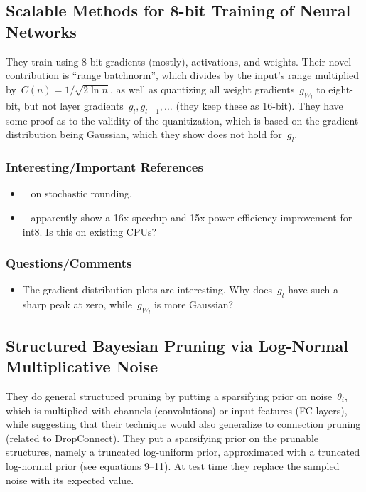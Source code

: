 \documentclass[a4paper, 12pt]{article}
\begin{document}
\subsection{Scalable Methods for 8-bit Training of Neural
            Networks~\cite{banner2018scalable}}

They train using 8-bit gradients (mostly), activations, and weights. Their
novel contribution is ``range batchnorm'', which divides by the input's range
multiplied by~$C(n) = 1/\sqrt{2\ln n}$, as well as quantizing all weight
gradients~$g_{W_l}$ to eight-bit, but not layer gradients~$g_l, g_{l - 1},
\dots$ (they keep these as 16-bit). They have some proof as to the validity of
the quanitization, which is based on the gradient distribution being Gaussian,
which they show does not hold for~$g_l$.

\subsubsection{Interesting/Important References}

\begin{itemize}
        \item~\cite{gupta2015deep} on stochastic rounding.

        \item~\cite{hubara2017jmlr} apparently show a 16x speedup and 15x power
                efficiency improvement for int8. Is this on existing CPUs?
\end{itemize}

\subsubsection{Questions/Comments}

\begin{itemize}
        \item The gradient distribution plots are interesting. Why does~$g_l$
                have such a sharp peak at zero, while~$g_{W_l}$ is more
                Gaussian?
\end{itemize}


\subsection{Structured Bayesian Pruning via Log-Normal Multiplicative
            Noise~\cite{neklyudov2017structured}}

They do general structured pruning by putting a sparsifying prior on
noise~$\theta_i$, which is multiplied with channels (convolutions) or input
features (FC layers), while suggesting that their technique would also
generalize to connection pruning (related to DropConnect).
They put a sparsifying prior on the prunable structures, namely a truncated
log-uniform prior, approximated with a truncated log-normal prior (see
equations 9--11).
At test time they replace the sampled noise with its expected value.
\end{document}
